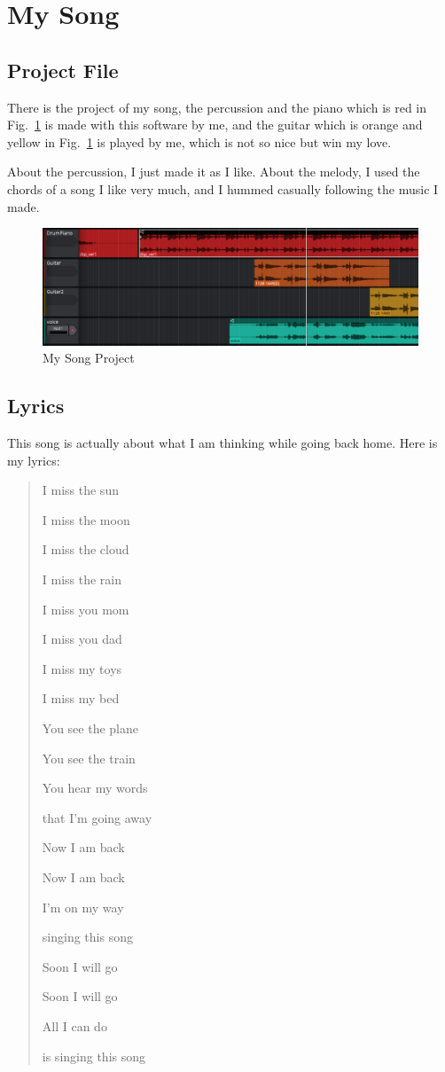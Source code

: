\documentclass{article}
\begin{document}
\section{My Song}
\subsection{Project File}
There is the project of my song, the percussion and the piano which is red in Fig.~\ref{fig:MySongProj} is made with this software by me, and the guitar which is orange and yellow in Fig.~\ref{fig:MySongProj} is played by me, which is not so nice but win my love.

About the percussion, I just made it as I like. 
About the melody, I used the chords of a song I like very much, and I hummed casually following the music I made.

\begin{figure}[!h]
	\centering
	\includegraphics[width=6 in]{../pic/MySongProj.png}
	\caption{My Song Project}
	\label{fig:MySongProj}
\end{figure}

\newpage

\subsection{Lyrics}

This song is actually about what I am thinking while going back home.
Here is my lyrics:

\begin{quotation}
I miss the sun

I miss the moon

I miss the cloud

I miss the rain

I miss you mom

I miss you dad

I miss my toys

I miss my bed

You see the plane

You see the train

You hear my words

that I'm going away

Now I am back

Now I am back

I'm on my way

singing this song

Soon I will go

Soon I will go

All I can do

is singing this song
\end{quotation}
\end{document}
